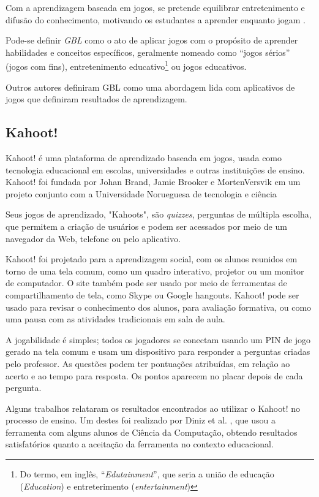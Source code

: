 \documentclass[
	12pt,				%
	openright,			%
	oneside,
	a4paper,			%
	english,			%
	french,				%
	spanish,			%
	brazil,				%
	]{abntex2}
\begin{document}
Com a aprendizagem baseada em jogos, se pretende equilibrar
entretenimento e difusão do conhecimento, motivando os estudantes a aprender
enquanto jogam \cite{monsalve2011teaching}.

Pode-se definir \textit{GBL} como o ato de aplicar jogos com o propósito de aprender habilidades e conceitos específicos, geralmente nomeado como “jogos sérios” (jogos com
fins), entretenimento educativo\footnote{Do termo, em inglês, “\textit{Edutainment}”, que seria a união de educação (\textit{Education}) e entreterimento (\textit{entertainment})} ou jogos educativos. \cite{Souza:2017:GLB:3103028.3103054}

Outros autores definiram GBL como uma abordagem lida com aplicativos de jogos que definiram resultados de aprendizagem. \cite{von2009game}

\subsection{Kahoot!}
\label{sec:Kahoot!}
Kahoot! é uma plataforma de aprendizado baseada em jogos, usada como tecnologia educacional em escolas, universidades e outras instituições de ensino. Kahoot! foi fundada por Johan Brand, Jamie Brooker e MortenVersvik em um projeto conjunto com a Universidade Norueguesa de tecnologia e ciência \cite{kahoot2018}

Seus jogos de aprendizado, "Kahoots", são \textit{quizzes}, perguntas de múltipla escolha, que permitem a criação de usuários e podem ser acessados por meio de um navegador da Web, telefone ou pelo aplicativo.

Kahoot! foi projetado para a aprendizagem social, com os alunos reunidos em torno de uma tela comum, como um quadro interativo, projetor ou um monitor de computador. O site também pode ser usado por meio de ferramentas de compartilhamento de tela, como Skype ou Google hangouts. Kahoot! pode ser usado para revisar o conhecimento dos alunos, para avaliação formativa\cite{kahootFormative}, ou como uma pausa com as atividades tradicionais em sala de aula. 

A jogabilidade é simples; todos os jogadores se conectam usando um PIN de jogo gerado na tela comum e usam um dispositivo para responder a perguntas criadas pelo professor. As questões podem ter pontuações atribuídas, em relação ao acerto e ao tempo para resposta. Os pontos aparecem no placar depois de cada pergunta.

Alguns trabalhos relataram os resultados encontrados ao utilizar o Kahoot! no processo de ensino. Um destes foi realizado por Diniz et al. \cite{diniz2018kahoot}, que usou a ferramenta com alguns alunos de Ciência da Computação, obtendo resultados satisfatórios quanto a aceitação da ferramenta no contexto educacional.
\end{document}
